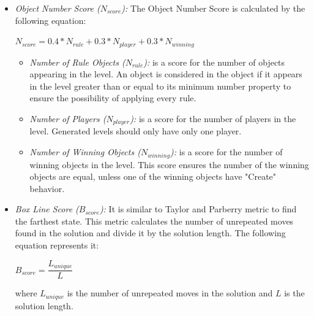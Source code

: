 \documentclass[letterpaper]{article}
\begin{document}
\begin{itemize}
	\item \emph{Object Number Score ($N_{score}$):} The Object Number Score is calculated by the following equation:
	\begin{center}$N_{score} = 0.4 * N_{rule} + 0.3 * N_{player} + 0.3 * N_{winning}$\end{center}
	\begin{itemize}
		\item \emph{Number of Rule Objects ($N_{rule}$):} is a score for the number of objects appearing in the level. An object is considered in the object if it appears in the level greater than or equal to its minimum number property to ensure the possibility of applying every rule.
		\item \emph{Number of Players ($N_{player}$):} is a score for the number of players in the level. Generated levels should only have only one player.
		\item \emph{Number of Winning Objects ($N_{winning}$):} is a score for the number of winning objects in the level. This score ensures the number of the winning objects are equal, unless one of the winning objects have "Create" behavior.
	\end{itemize}
	
	\item \emph{Box Line Score ($B_{score}$):} It is similar to Taylor and Parberry metric\cite{sokobanLevelGenerationNew} to find the farthest state. This metric calculates the number of unrepeated moves found in the solution and divide it by the solution length. The following equation represents it:
	\begin{center}$B_{score} = \dfrac{L_{unique}}{L}$\end{center}
	where $L_{unique}$ is the number of unrepeated moves in the solution and $L$ is the solution length.
	

\end{itemize}
\end{document}
